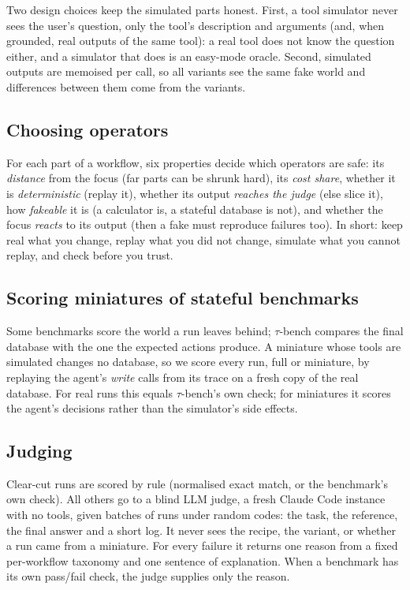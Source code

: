 Two design choices keep the simulated parts honest. First, a tool simulator never sees the user's
question, only the tool's description and arguments (and, when grounded, real outputs of the same
tool): a real tool does not know the question either, and a simulator that does is an easy-mode
oracle. Second, simulated outputs are memoised per call, so all variants see the same fake world
and differences between them come from the variants.

\subsection{Choosing operators}
For each part of a workflow, six properties decide which operators are safe: its \emph{distance}
from the focus (far parts can be shrunk hard), its \emph{cost share}, whether it is
\emph{deterministic} (replay it), whether its output \emph{reaches the judge} (else slice it), how
\emph{fakeable} it is (a calculator is, a stateful database is not), and whether the focus
\emph{reacts} to its output (then a fake must reproduce failures too). In short: keep real what you
change, replay what you did not change, simulate what you cannot replay, and check before you
trust.

\subsection{Scoring miniatures of stateful benchmarks}
Some benchmarks score the world a run leaves behind; $\tau$-bench \citep{yao2024taubench} compares the
final database with the one the expected actions produce. A miniature whose tools are simulated
changes no database, so we score every run, full or miniature, by replaying the agent's
\emph{write} calls from its trace on a fresh copy of the real database. For real runs this equals
$\tau$-bench's own check; for miniatures it scores the agent's decisions rather than the
simulator's side effects.

\subsection{Judging}
Clear-cut runs are scored by rule (normalised exact match, or the benchmark's own check). All
others go to a blind LLM judge, a fresh Claude Code instance with no tools, given batches of runs
under random codes: the task, the reference, the final answer and a short log. It never sees the
recipe, the variant, or whether a run came from a miniature. For every failure it returns one
reason from a fixed per-workflow taxonomy and one sentence of explanation. When a benchmark has
its own pass/fail check, the judge supplies only the reason.

